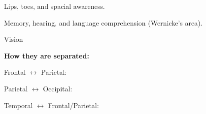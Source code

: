 \begin{coloredlist}
\begin{coloredlist}
\begin{coloredlist}
\begin{coloredlist}
            \end{coloredlist}
            \item {}
            \begin{coloredlist}
                \item Lips, toes, and spacial awareness.
            \end{coloredlist}
            \item {}
            \begin{coloredlist}
                \item Memory, hearing, and language comprehension (Wernicke's area).
            \end{coloredlist}
            \item {}
            \begin{coloredlist}
                \item Vision
            \end{coloredlist}
            \item \textbf{How they are separated:}
            \begin{coloredlist}
                \item Frontal \(\leftrightarrow\) Parietal: 
                \item Parietal \(\leftrightarrow\) Occipital: 
                \item Temporal \(\leftrightarrow\) Frontal/Parietal: 
            \end{coloredlist}
        \end{coloredlist}
    \end{coloredlist}
    \item {}
\end{coloredlist}



\hypertarget{parkinson}{}
